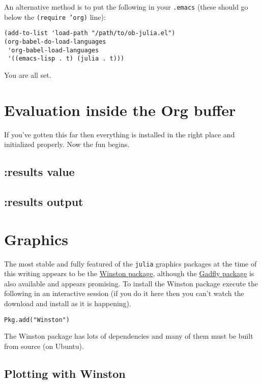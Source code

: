 \documentclass[11pt]{article}
\begin{document}
An alternative method is to put the following in your \texttt{.emacs} (these should go below the \texttt{(require 'org)} line):

\begin{verbatim}
(add-to-list 'load-path "/path/to/ob-julia.el")
(org-babel-do-load-languages
 'org-babel-load-languages
 '((emacs-lisp . t) (julia . t)))
\end{verbatim}

You are all set.
\section[Evaluation inside the Org buffer]{Evaluation inside the Org buffer}
\label{sec-2}

If you've gotten this far then everything is installed in the right place and initialized properly.  Now the fun begins. 

\subsection[:results value]{:results value}
\label{sec-2-1}

\subsection[:results output]{:results output}
\label{sec-2-2}
\section[Graphics]{Graphics}
\label{sec-3}

The most stable and fully featured of the \texttt{julia} graphics packages at the time of this writing appears to be the \href{https://github.com/nolta/Winston.jl}{Winston package}, although the \href{https://github.com/dcjones/Gadfly.jl}{Gadfly package} is also available and appears promising.  To install the Winston package execute the following in an interactive session (if you do it here then you can't watch the download and install as it is happening).

\begin{verbatim}
Pkg.add("Winston")
\end{verbatim}

The Winston package has lots of dependencies and many of them must be built from source (on Ubuntu).

\subsection[Plotting with Winston]{Plotting with Winston}
\label{sec-3-1}
\end{document}
